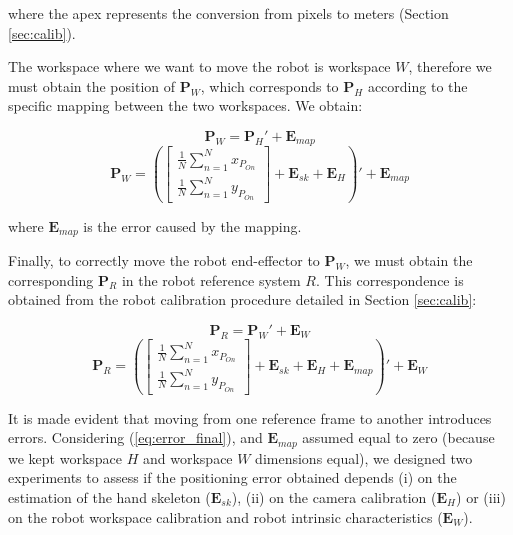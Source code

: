 \documentclass[a4paper, 10 pt, conference]{ieeeconf}      %
\begin{document}
where the apex represents the conversion from pixels to meters (Section \ref{sec:calib}).

The workspace where we want to move the robot is workspace $W$, therefore we must obtain the position of $\mathbf{P}_W$, which corresponds to $\mathbf{P}_H$ according to the specific mapping between the two workspaces. We obtain:

\begin{equation}
\mathbf{P}_W = \mathbf{P}_H' + \mathbf{E}_{map}
\end{equation}
\begin{equation}
\mathbf{P}_W = \left(\begin{bmatrix}
\frac{1}{N}\sum_{n=1}^{N}x_{P_{On}} \\
\frac{1}{N}\sum_{n=1}^{N}y_{P_{On}}
\end{bmatrix} + \mathbf{E}_{sk} + \mathbf{E}_{H}\right)' + \mathbf{E}_{map}
\end{equation}

where $\mathbf{E}_{map}$ is the error caused by the mapping.

Finally, to correctly move the robot end-effector to $\mathbf{P}_W$, we must obtain the corresponding $\mathbf{P}_R$ in the robot reference system $R$. This correspondence is obtained from the robot calibration procedure detailed in Section \ref{sec:calib}: 

\begin{equation}
\mathbf{P}_R = \mathbf{P}_W' + \mathbf{E}_W
\end{equation}
\begin{equation}\label{eq:error_final}
\mathbf{P}_R = \left(\begin{bmatrix}
\frac{1}{N}\sum_{n=1}^{N}x_{P_{On}} \\
\frac{1}{N}\sum_{n=1}^{N}y_{P_{On}}
\end{bmatrix} + \mathbf{E}_{sk} + \mathbf{E}_{H} + \mathbf{E}_{map} \right)' + \mathbf{E}_W
\end{equation}

It is made evident that moving from one reference frame to another introduces errors. Considering (\ref{eq:error_final}), and $\mathbf{E}_{map}$ assumed equal to zero (because we kept workspace $H$ and workspace $W$ dimensions equal), we designed two experiments to assess if the positioning error obtained depends (i) on the estimation of the hand skeleton ($\mathbf{E}_{sk}$), (ii) on the camera calibration ($\mathbf{E}_{H}$) or (iii) on the robot workspace calibration and robot intrinsic characteristics ($\mathbf{E}_{W}$).
\end{document}
